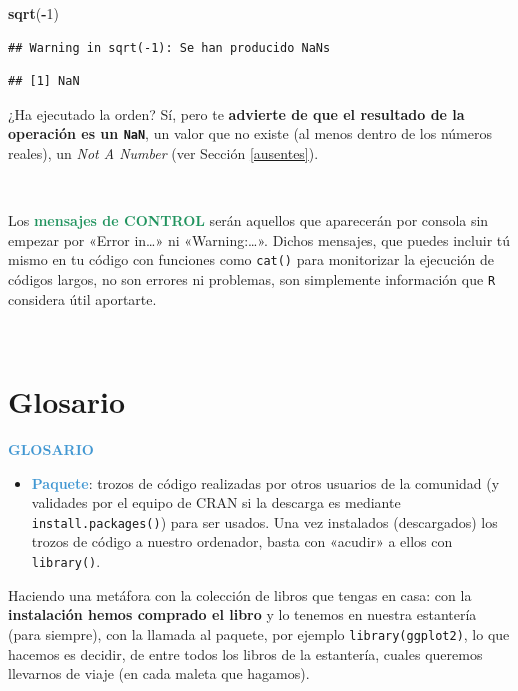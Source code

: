 \documentclass[11pt,]{book}
\newenvironment{Shaded}{\begin{snugshade}}{\end{snugshade}}
\newcommand{\DecValTok}[1]{\textcolor[rgb]{0.06,0.06,0.06}{#1}}
\newcommand{\KeywordTok}[1]{\textcolor[rgb]{0.27,0.27,0.27}{\textbf{#1}}}
\newcommand{\NormalTok}[1]{#1}
\newcommand{\OperatorTok}[1]{\textcolor[rgb]{0.43,0.43,0.43}{\textbf{#1}}}
\providecommand{\tightlist}{%
  \setlength{\itemsep}{0pt}\setlength{\parskip}{0pt}}
\begin{document}
\begin{Shaded}
\begin{Highlighting}[]
\KeywordTok{sqrt}\NormalTok{(}\OperatorTok{-}\DecValTok{1}\NormalTok{)}
\end{Highlighting}
\end{Shaded}

\begin{verbatim}
## Warning in sqrt(-1): Se han producido NaNs
\end{verbatim}

\begin{verbatim}
## [1] NaN
\end{verbatim}

¿Ha ejecutado la orden? Sí, pero te \textbf{advierte de que el resultado de la operación es un \texttt{NaN}}, un valor que no existe (al menos dentro de los números reales), un \emph{Not A Number} (ver Sección \ref{ausentes}).

~

Los \textbf{\textcolor{#20935E}{mensajes de CONTROL}} serán aquellos que aparecerán por consola sin empezar por «Error in\ldots{}» ni «Warning:\ldots{}». Dichos mensajes, que puedes incluir tú mismo en tu código con funciones como \texttt{cat()} para monitorizar la ejecución de códigos largos, no son errores ni problemas, son simplemente información que \texttt{R} considera útil aportarte.

~

\hypertarget{glosario-2}{%
\section{Glosario}\label{glosario-2}}

\textbf{\textcolor{#4197D2}{GLOSARIO}}

\begin{itemize}
\tightlist
\item
  \textbf{\textcolor{#4197D2}{Paquete}}: trozos de código realizadas por otros usuarios de la comunidad (y validades por el equipo de CRAN si la descarga es mediante \texttt{install.packages()}) para ser usados. Una vez instalados (descargados) los trozos de código a nuestro ordenador, basta con «acudir» a ellos con \texttt{library()}.
\end{itemize}

Haciendo una metáfora con la colección de libros que tengas en casa: con la \textbf{instalación hemos comprado el libro} y lo tenemos en nuestra estantería (para siempre), con la llamada al paquete, por ejemplo \texttt{library(ggplot2)}, lo que hacemos es decidir, de entre todos los libros de la estantería, cuales queremos llevarnos de viaje (en cada maleta que hagamos).
\end{document}
